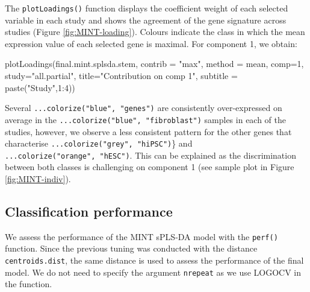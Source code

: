 \documentclass[
]{book}
\newenvironment{Shaded}{\begin{snugshade}}{\end{snugshade}}
\newcommand{\AttributeTok}[1]{\textcolor[rgb]{0.77,0.63,0.00}{#1}}
\newcommand{\CommentTok}[1]{\textcolor[rgb]{0.56,0.35,0.01}{\textit{#1}}}
\newcommand{\DecValTok}[1]{\textcolor[rgb]{0.00,0.00,0.81}{#1}}
\newcommand{\FunctionTok}[1]{\textcolor[rgb]{0.00,0.00,0.00}{#1}}
\newcommand{\NormalTok}[1]{#1}
\newcommand{\SpecialCharTok}[1]{\textcolor[rgb]{0.00,0.00,0.00}{#1}}
\newcommand{\StringTok}[1]{\textcolor[rgb]{0.31,0.60,0.02}{#1}}
\begin{document}
\begin{Shaded}
\end{Shaded}

The \texttt{plotLoadings()} function displays the coefficient weight of each selected variable in each study and shows the agreement of the gene signature across studies (Figure \ref{fig:MINT-loading}). Colours indicate the class in which the mean expression value of each selected gene is maximal. For component 1, we obtain:

\begin{Shaded}
\begin{Highlighting}[]
\FunctionTok{plotLoadings}\NormalTok{(final.mint.splsda.stem, }\AttributeTok{contrib =} \StringTok{"max"}\NormalTok{, }\AttributeTok{method =} \StringTok{\textquotesingle{}mean\textquotesingle{}}\NormalTok{, }\AttributeTok{comp=}\DecValTok{1}\NormalTok{, }
             \AttributeTok{study=}\StringTok{"all.partial"}\NormalTok{, }\AttributeTok{title=}\StringTok{"Contribution on comp 1"}\NormalTok{, }
             \AttributeTok{subtitle =} \FunctionTok{paste}\NormalTok{(}\StringTok{"Study"}\NormalTok{,}\DecValTok{1}\SpecialCharTok{:}\DecValTok{4}\NormalTok{))}
\end{Highlighting}
\end{Shaded}



Several \texttt{...colorize("blue",\ "genes")} are consistently over-expressed on average in the \texttt{...colorize("blue",\ "fibroblast")} samples in each of the studies, however, we observe a less consistent pattern for the other genes that characterise \texttt{...colorize("grey",\ "hiPSC")}\} and \texttt{...colorize("orange",\ "hESC")}. This can be explained as the discrimination between both classes is challenging on component 1 (see sample plot in Figure \ref{fig:MINT-indiv}).

\hypertarget{mint:result:perf}{%
\subsection{Classification performance}\label{mint:result:perf}}

We assess the performance of the MINT sPLS-DA model with the \texttt{perf()} function. Since the previous tuning was conducted with the distance \texttt{centroids.dist}, the same distance is used to assess the performance of the final model. We do not need to specify the argument \texttt{nrepeat} as we use LOGOCV in the function.
\end{document}
